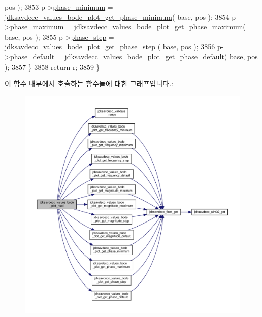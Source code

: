 \begin{DoxyCode}
      pos );
3853         p->\hyperlink{structjdksavdecc__values__bode__plot_a8e404eb68fb24ec7bc16daaf6f826c3a}{phase\_minimum} = 
      \hyperlink{group__values__bode__plot_ga1f403fc5554e1111c3a29e17329d65ee}{jdksavdecc\_values\_bode\_plot\_get\_phase\_minimum}( base, pos );
3854         p->\hyperlink{structjdksavdecc__values__bode__plot_a5dfca76f4af2509da81aa5658afae11c}{phase\_maximum} = 
      \hyperlink{group__values__bode__plot_ga42e4ab45e4b3ad676174f57d4dbd1c89}{jdksavdecc\_values\_bode\_plot\_get\_phase\_maximum}( base, pos );
3855         p->\hyperlink{structjdksavdecc__values__bode__plot_af6b595fa87a001625f4cd8f0c5a4611c}{phase\_step} = \hyperlink{group__values__bode__plot_ga824e85667783e7331832dd4163acb9a3}{jdksavdecc\_values\_bode\_plot\_get\_phase\_step}
      ( base, pos );
3856         p->\hyperlink{structjdksavdecc__values__bode__plot_acbb532133ed4fca28d4d904470007758}{phase\_default} = 
      \hyperlink{group__values__bode__plot_gabbaa61ac921fd5ddd78901c8c5364224}{jdksavdecc\_values\_bode\_plot\_get\_phase\_default}( base, pos );
3857     \}
3858     \textcolor{keywordflow}{return} r;
3859 \}
\end{DoxyCode}


이 함수 내부에서 호출하는 함수들에 대한 그래프입니다.\+:
\nopagebreak
\begin{figure}[H]
\begin{center}
\leavevmode
\includegraphics[width=350pt]{group__values__bode__plot_gad97b2e8a52f780f165d31bb2b133881a_cgraph}
\end{center}
\end{figure}


